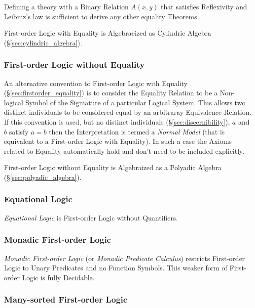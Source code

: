Defining a theory with a Binary Relation $A(x,y)$ that satisfies
Reflexivity and Leibniz's law is sufficient to derive any other
equality Theorems.

First-order Logic with Equality is Algebraeized as Cylindric Algebra
(\S\ref{sec:cylindric_algebra}).



\subsubsection{First-order Logic without Equality}
\label{sec:firstorder_no_equality}

An alternative convention to First-order Logic with Equality
(\S\ref{sec:firstorder_equality}) is to consider the Equality Relation
to be a Non-logical Symbol of the Signiature of a particular Logical
System. This allows two distinct individuals to be considered equal by
an arbitraray Equivalence Relation. If this convention is used, but no
distinct individuals (\S\ref{sec:discernibility}), $a$ and $b$ satisfy
$a=b$ then the Interpretation is termed a \emph{Normal Model} (that is
equivalent to a First-order Logic with Equality). In such a case the
Axioms related to Equality automatically hold and don't need to be
included explicitly.

First-order Logic without Equality is Algebraized as a Polyadic
Algebra (\S\ref{sec:polyadic_algebra}).



\subsubsection{Equational Logic}\label{sec:equational_logic}

\emph{Equational Logic} is First-order Logic without Quantifiers.



\subsubsection{Monadic First-order Logic}\label{sec:monadic_firstorder}

\emph{Monadic First-order Logic} (or \emph{Monadic Predicate
  Calculus}) restricts First-order Logic to Unary Predicates and no
Function Symbols. This weaker form of First-order Logic is fully
Decidable.



\subsubsection{Many-sorted First-order Logic}
\label{sec:manysorted_logic}

